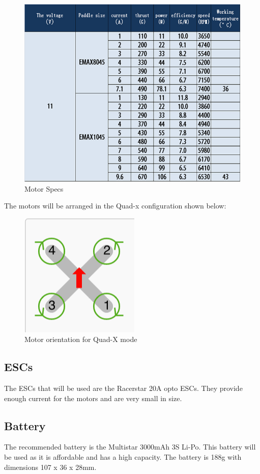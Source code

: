 \documentclass[12pt]{article}
\begin{document}
\begin{figure}[!htb]
\caption{Motor Specs}
\centering
\includegraphics[scale=0.4]{motor_specs.jpg}
\end{figure}

The motors will be arranged in the Quad-x configuration shown below:

\begin{figure}[!htb]
\caption{Motor orientation for Quad-X mode}
\centering
\includegraphics[scale=0.5]{quadx.png}
\end{figure}


\subsection{ESCs}
The ESCs that will be used are the Racerstar 20A opto ESCs. They provide enough current for the motors and are very small in size.

\subsection{Battery}
The recommended battery is the Multistar 3000mAh 3S Li-Po. This battery will be used as it is affordable and has a high capacity. The battery is 188g with dimensions 107 x 36 x 28mm. 
\\
\end{document}
